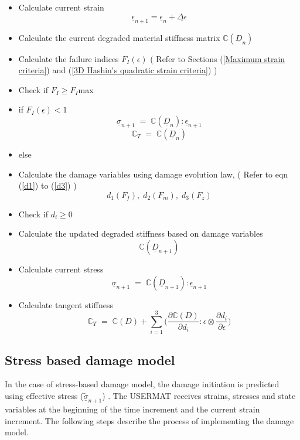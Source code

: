 \documentclass[12pt,a4paper,twoside,openright]{report}
\begin{document}
\begin{itemize}
\item Calculate current strain \textbf{$$ \underline{\epsilon}_{n+1} = \underline{\epsilon}_{n} + \underline{\Delta \epsilon} $$}
\item Calculate the current degraded material stiffness matrix  \textbf{$\mathbb{C}(\underline{D}_{n})$}
\item Calculate the failure indices \textbf{$F_{I}(\underline{\epsilon})$} \;\; ( Refer to Sections (\ref{Maximum strain criteria}) and (\ref{3D Hashin's quadratic strain criteria}) )
\item[] Check if $F_{I} \geq F_{I}$max
\item if \textbf{$F_{I}(\underline{\epsilon})<1$} \textbf{$$\underline{\sigma}_{n+1} \; = \; \mathbb{C}(\underline{D}_{n}) :  \underline{\epsilon}_{n+1} $$} \textbf{$$\mathbb{C}_{T} \; = \; \mathbb{C}(\underline{D}_{n})$$}
\item else
\item[]  Calculate the damage variables using damage evolution law, \;\; ( Refer to eqn (\ref{d1}) to (\ref{d3}) ) \textbf{$$d_{1}(F_{f}),\;d_{2}(F_{m}),\;d_{3}(F_{z})$$}
\item[]  Check if $d_{i} \geq 0 $ 
\item[]  Calculate the updated degraded stiffness based on damage variables \textbf{$$\mathbb{C}(\underline{D}_{n+1})$$}
\item[]  Calculate current stress  \textbf{$$\underline{\sigma}_{n+1} \; = \; \mathbb{C}(\underline{D}_{n+1}) :  \underline{\epsilon}_{n+1} $$}
\item[] Calculate tangent stiffness \textbf{$$\mathbb{C}_{T}  \; = \;\mathbb{C}(D) + \sum_{i = 1}^{3} \Big( \frac{\partial \mathbb{C}(D) }{\partial d_{i}} : \epsilon \otimes \frac{\partial d_{i}}{\partial \epsilon }\Big)$$}
	
\end{itemize} 


\subsection{Stress based damage model}
\indent\indent\indent  In the case of stress-based damage model, the damage initiation is predicted using effective stress ($\underline{\tilde{\sigma}}_{n+1}$) \citep{jiang2018evaluations}.  The USERMAT receives strains, stresses and state variables at the beginning of the time increment and the current strain increment. The following steps describe the process of implementing the damage model.
\end{document}
